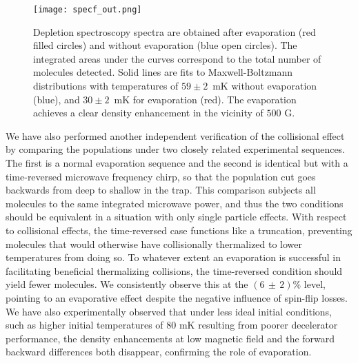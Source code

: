 \documentclass[%
 reprint,
 amsmath,amssymb,
 aps,
prl,
]{revtex4-1}
\begin{document}
\begin{figure}[tb]
\texttt{[image: specf\_out.png]}%
\caption{
Depletion spectroscopy spectra are obtained after evaporation (red filled circles) and without evaporation (blue open circles). The integrated areas under the curves correspond to the total number of molecules detected. Solid lines are fits to Maxwell-Boltzmann distributions with temperatures of $59\pm2$~mK without evaporation (blue), and $30\pm2$~mK for evaporation (red). The evaporation achieves a clear density enhancement in the vicinity of $500\text{ G}$.
}
\label{fig:normenhance}
\end{figure}

We have also performed another independent verification of the collisional effect by comparing the populations under two closely related experimental sequences.
The first is a normal evaporation sequence and the second is identical but with a time-reversed microwave frequency chirp, so that the population cut goes backwards from deep to shallow in the trap.
This comparison subjects all molecules to the same integrated microwave power, and thus the two conditions should be equivalent in a situation with only single particle effects.
With respect to collisional effects, the time-reversed case functions like a truncation, preventing molecules that would otherwise have collisionally thermalized to lower temperatures from doing so.
To whatever extent an evaporation is successful in facilitating beneficial thermalizing collisions, the time-reversed condition should yield fewer molecules.
We consistently observe this at the $(6\,{\pm}\,2)\%$ level, pointing to an evaporative effect despite the negative influence of spin-flip losses.
We have also experimentally observed that under less ideal initial conditions, such as higher initial temperatures of $80\text{ mK}$ resulting from poorer decelerator performance, the density enhancements at low magnetic field and the forward backward differences both disappear, confirming the role of evaporation. 
\end{document}
